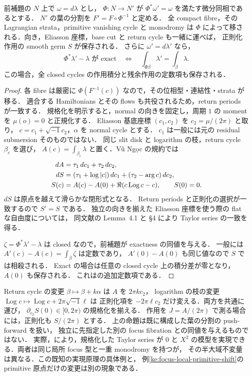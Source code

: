 \begin{proposition}
\label{ke:focus-whole-neighborhood-transport}
前補題の $N$ 上で $\omega=d\lambda$ とし，
$\Phi:N\to N'$ が $\Phi^*\omega'=\omega$ を満たす微分同相であるとする．
$N'$ の葉の分割を $F'=F\circ\Phi^{-1}$ と定める．
全 compact fibre，その Lagrangian strata，primitive vanishing cycle と monodromy は
$\Phi$ によって移される．向き，Eliasson 座標，base cut と return cycle も一緒に運べば，
正則化作用の smooth germ $S$ が保存される．
さらに $\omega'=d\lambda'$ なら，
\[
 \Phi^*\lambda'-\lambda\text{ が exact}
 \quad\Longleftrightarrow\quad
 \int_{\Phi\beta}\lambda'=\int_\beta\lambda.
\]
この場合，全 closed cycles の作用積分と残余作用の定数項も保存される．
\end{proposition}
\begin{proof}
各 fibre は厳密に $\Phi(F^{-1}(c))$ なので，その位相型・連結性・strata が移る．
適合する Hamiltonians とその flows も共役されるため，return periods が一致する．
規格化を明示すると，normal の向きを固定し，周期 $1$ の moment を $\mu(o)=0$ と正規化する．
Eliasson 基底座標 $(c_1,c_2)$ を $c_2=\mu/(2\pi)$ と取り，
$c=c_1+\sqrt{-1}c_2$，$\alpha$ を normal cycle とする．
$c_1$ は一般には元の residual submersion そのものではない．
同じ slit disk と logarithm の枝，return cycle $\beta_c$ を選び，
$A(c)=\int_{\beta_c}\lambda$ と置く．V\~u Ng\d{o}c の規約では
\begin{align}
 dA&=\tau_1\,dc_1+\tau_2\,dc_2,\notag\\
 dS&=(\tau_1+\log|c|)\,dc_1+(\tau_2-\arg c)\,dc_2,\notag\\
 S(c)&=A(c)-A(0)+\Re(c\operatorname{Log}c-c),\qquad S(0)=0.
 \label{ke:eq:focus-regularized-action}
\end{align}
$dS$ は原点を越えて滑らかな閉形式となる\cite[Proposition 3.1, Definition 3.1]{VuNgoc}．
Return periods と正則化の選択が一致するので $S'=S$ である．
独立の向きを揃えた Eliasson 座標を使う際の flat な自由度については，
同文献の Lemma~4.1 と \S4 により Taylor series の一致を得る．

$\zeta=\Phi^*\lambda'-\lambda$ は closed なので，前補題が exactness の同値を与える．
一般には $A'(c)-A(c)=\int_\beta\zeta$ は定数であり，
$A'(0)-A(0)$ も同じ値なので $S$ では相殺される．
Exact の場合は任意の closed cycle 上の積分差が零となり，$A(0)$ も保存される．
これは\cite[\S7, ``Exact version'']{VuNgoc}の追加定数項である．
\end{proof}

Return cycle の変更 $\beta\mapsto\beta+k\alpha$ は $A$ を $2\pi k c_2$，
logarithm の枝の変更 $\operatorname{Log}c\mapsto\operatorname{Log}c+2\pi\sqrt{-1}\ell$ は
正則化項を $-2\pi\ell c_2$ だけ変える．両方を共通に運び，
$\partial_{c_2}S(0)\in[0,2\pi)$ の規格化を揃える．
作用を $J=A/(2\pi)$ で測る場合には，正則化も $S/(2\pi)$ とする．
上の命題は既に構成した葉の分割の push-forward を扱い，
独立に先指定した別の focus fibration との同値を与えるものではない．
実際，\cite[Theorem 2.1, \S6]{VuNgoc}により，規格化した Taylor series が
$0$ と $X^2$ の模型を実現できる．両者は同じ局所 focus 型と一重 monodromy を持つが，
その半大域不変量は異なる．この既知の実現原理の具体例と，
例\ref{ke:focus-local-primitive-shift}の primitive 原点だけの変更は別の現象である．

